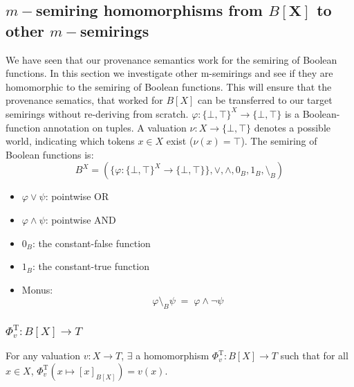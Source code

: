 \subsection{$m-$semiring homomorphisms from $B[\mathbf{X}]$ to other $m-$semirings }
We have seen that our provenance semantics work for 
the semiring of Boolean functions. In this section we investigate other m-semirings and see if they are homomorphic 
to the semiring of Boolean functions. This will ensure that the provenance sematics, that worked for $B[X]$ can be transferred to 
our target semirings without re-deriving from scratch.
\(\varphi\colon \{\bot,\top\}^X \to \{\bot,\top\}\) is a Boolean-function annotation on tuples.
A valuation \(\nu\colon X \to \{\bot,\top\}\) denotes a possible world,
  indicating which tokens \(x\in X\) exist (\(\nu(x)=\top\)).
The semiring of Boolean functions is:
$$
B^X = (\{\varphi : \{ \bot,\top \}^X \to \{\bot,\top\}\},\vee,\wedge,0_B,1_B,\setminus_B)
$$
\begin{itemize}
    \item \(\varphi \vee \psi\): pointwise OR
    \item \(\varphi \wedge \psi\): pointwise AND
    \item \(0_B\): the constant-false function
    \item \(1_B\): the constant-true function
    \item Monus:
        $$
        \varphi \setminus_B \psi \;=\; \varphi \wedge \neg \psi
        $$
\end{itemize}

\subsubsection{$\Phi^{\mathrm{T}}_v : B[X] \to T$}
For any valuation $v:X \to T$,  $\exists$ a homomorphism $\Phi^{\mathrm{T}}_v : B[X] \to T$ such that for all $x\in X$, 
$\Phi^{\mathrm{T}}_v(x\mapsto [x]_{B[X]})=v(x)$.

